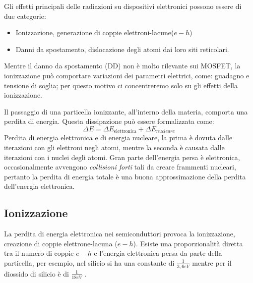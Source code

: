 
Gli effetti principali delle radiazioni su dispositivi elettronici possono essere di due categorie\cite{bib:Effetti_Radiazioni_1987}:
\begin{itemize}
	\item Ionizzazione, generazione di coppie elettroni-lacune($e-h$)
	\item Danni da spostamento, dislocazione degli atomi dai loro siti reticolari.
\end{itemize}
Mentre il danno da spostamento (DD) non è molto rilevante sui MOSFET, la ionizzazione può comportare variazioni dei parametri elettrici, come: guadagno e tensione di soglia; per questo motivo ci concentreremo solo su gli effetti della ionizzazione.

\vspace{0.5cm}

Il passaggio di una particella ionizzante, all'interno della materia, comporta una perdita di energia. Questa dissipazione può essere formalizzata come:
$$ \Delta E = \Delta E_{\text{elettronica}} + \Delta E_{nucleare} $$
Perdita di energia elettronica e di energia nucleare, la prima è dovuta dalle iterazioni con gli elettroni negli atomi, mentre la seconda è causata dalle iterazioni con i nuclei degli atomi.
Gran parte dell'energia persa è elettronica, occasionalmente avvengono \textit{collisioni forti} tali da creare frammenti nucleari, pertanto la perdita di energia totale è una buona approssimazione della perdita dell'energia elettronica\cite{bib:Effetti_Radiazioni_NASA}.

\vspace{0.5cm}

\subsection{Ionizzazione}\label{cap1:ionizzazione}
La perdita di energia elettronica nei semiconduttori provoca la ionizzazione, creazione di coppie elettrone-lacuna ($e-h$). Esiste una proporzionalità diretta tra il numero di coppie $e-h$ e l'energia elettronica persa da parte della particella, per esempio, nel silicio si ha una constante di $\frac{1}{3,6eV}$ mentre per il diossido di silicio è di $\frac{1}{18eV}$ \cite{bib:Effetti_Radiazioni_NASA}.

\vspace{0.5cm}

